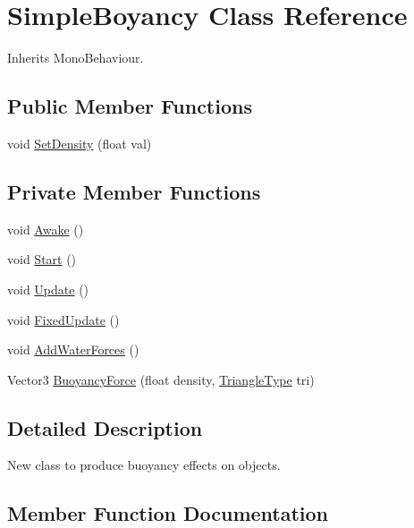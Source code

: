 \hypertarget{class_simple_boyancy}{}\section{Simple\+Boyancy Class Reference}
\label{class_simple_boyancy}


Inherits Mono\+Behaviour.

\subsection*{Public Member Functions}
\begin{DoxyCompactItemize}
\item 
void \hyperlink{class_simple_boyancy_a87c040d98ee3745e8eb1bb2b91fa1261}{Set\+Density} (float val)
\end{DoxyCompactItemize}
\subsection*{Private Member Functions}
\begin{DoxyCompactItemize}
\item 
void \hyperlink{class_simple_boyancy_a50976b477c44c01f1a21ba19e750b308}{Awake} ()
\item 
void \hyperlink{class_simple_boyancy_aaa7adc7a2919cd7c2138fdfa165bd96a}{Start} ()
\item 
void \hyperlink{class_simple_boyancy_ad1e88e01095b9f9ca6b3b58ece3c7644}{Update} ()
\item 
void \hyperlink{class_simple_boyancy_a61d29420919b334a33acc84663eaea57}{Fixed\+Update} ()
\item 
void \hyperlink{class_simple_boyancy_a6be2438811dcea90cb336116a0395f57}{Add\+Water\+Forces} ()
\item 
Vector3 \hyperlink{class_simple_boyancy_a6cf63e5c114b0e5679fe2e30ac7353a1}{Buoyancy\+Force} (float density, \hyperlink{struct_triangle_type}{Triangle\+Type} tri)
\end{DoxyCompactItemize}


\subsection{Detailed Description}
New class to produce buoyancy effects on objects. 



\subsection{Member Function Documentation}
\mbox{\label{class_simple_boyancy_a6be2438811dcea90cb336116a0395f57}} 
